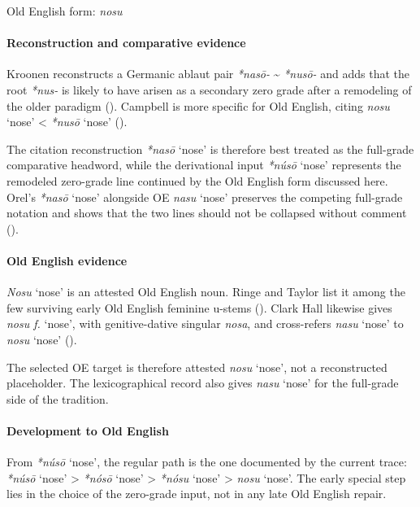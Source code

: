 \documentclass[
  british,
  a4paper,
]{article}
\providecommand{\Recon}[1]{\emph{*#1}}
\begin{document}
Old English form: \emph{nosu}

\paragraph{Reconstruction and comparative
evidence}\label{reconstruction-and-comparative-evidence-100}

Kroonen reconstructs a Germanic ablaut pair \emph{*nasō-}
\textasciitilde{} \emph{*nusō-} and adds that the root \emph{*nus-} is
likely to have arisen as a secondary zero grade after a remodeling of
the older paradigm ().
Campbell is more specific for Old English, citing \emph{nosu} `nose'
\textless{} \Recon{nusō} `nose' ().

The citation reconstruction \Recon{nasō} `nose' is therefore best
treated as the full-grade comparative headword, while the derivational
input \Recon{núsō} `nose' represents the remodeled zero-grade line
continued by the Old English form discussed here. Orel's \Recon{nasō}
`nose' alongside OE \emph{nasu} `nose' preserves the competing
full-grade notation and shows that the two lines should not be collapsed
without comment ().

\paragraph{Old English evidence}\label{old-english-evidence-100}

\emph{Nosu} `nose' is an attested Old English noun. Ringe and Taylor
list it among the few surviving early Old English feminine u-stems
(). Clark Hall
likewise gives \emph{nosu f.} `nose', with genitive-dative singular
\emph{nosa}, and cross-refers {\emph{nasu}} `nose' to \emph{nosu} `nose'
().

The selected OE target is therefore attested \emph{nosu} `nose', not a
reconstructed placeholder. The lexicographical record also gives
{\emph{nasu}} `nose' for the full-grade side of the tradition.

\paragraph{Development to Old
English}\label{development-to-old-english-100}

From \Recon{núsō} `nose', the regular path is the one documented by the
current trace: \Recon{núsō} `nose' \textgreater{} \Recon{nósō} `nose'
\textgreater{} \Recon{nósu} `nose' \textgreater{} \emph{nosu} `nose'.
The early special step lies in the choice of the zero-grade input, not
in any late Old English repair.
\end{document}
